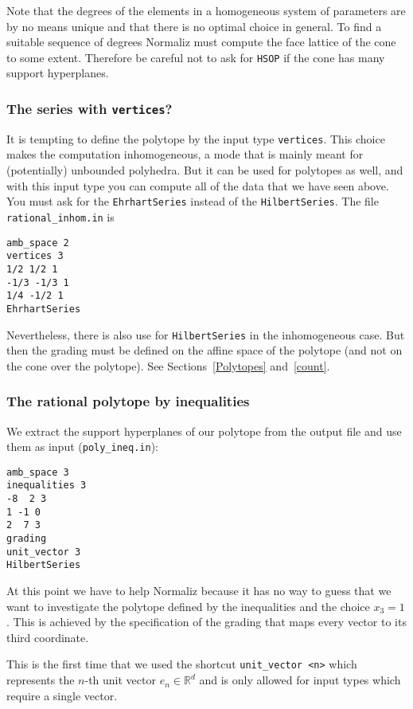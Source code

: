 \documentclass[12pt,a4paper]{scrartcl}
\theoremstyle{definition}
\def\RR{{\mathbb R}}
\def\ttt{\texttt}
\begin{document}
Note that the degrees of the elements in a homogeneous system of parameters are by no means unique and that there is no optimal choice in general. To find a suitable sequence of degrees Normaliz must compute the face lattice of the cone to some extent. Therefore be careful not to ask for \verb|HSOP| if the cone has many support hyperplanes.

\subsubsection{The series with \ttt{vertices}?}

It is tempting to define the polytope by the input type \verb|vertices|. This choice makes the computation inhomogeneous, a mode that is mainly meant for (potentially) unbounded polyhedra. But it can be used for polytopes as well, and with this input type you can compute all of the data that we have seen above. You must ask for the \verb|EhrhartSeries| instead of the \verb|HilbertSeries|. The file \verb|rational_inhom.in| is
\begin{Verbatim}
amb_space 2
vertices 3
1/2 1/2 1
-1/3 -1/3 1
1/4 -1/2 1
EhrhartSeries
\end{Verbatim}

Nevertheless, there is also use for \verb|HilbertSeries| in the inhomogeneous case. But then the grading must be defined on the affine space of the polytope (and not on the cone over the polytope). See Sections~\ref{Polytopes} and~\ref{count}.

\subsubsection{The rational polytope by inequalities}\label{rat_ineq}

We extract the support hyperplanes of our polytope from the output file and use them as input (\verb|poly_ineq.in|):
\begin{Verbatim}
amb_space 3
inequalities 3
-8  2 3
1 -1 0
2  7 3
grading
unit_vector 3
HilbertSeries
\end{Verbatim}
At this point we have to help Normaliz because it has no way to guess that we want to investigate the polytope defined by the inequalities and the choice $x_3=1$. This is achieved by the specification of the grading that maps every vector to its third coordinate.

This is the first time that we used the shortcut \verb|unit_vector <n>| which represents the $n$-th unit vector $e_n\in\RR^d$ and is only allowed for input types which require a single vector.
\end{document}
